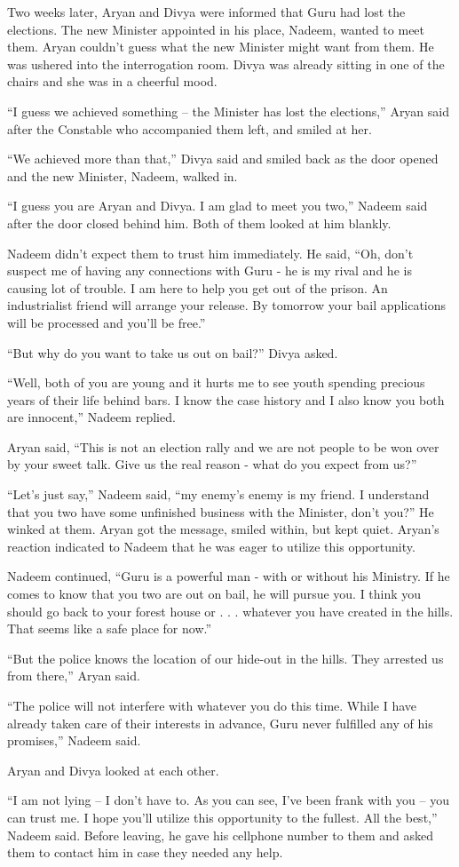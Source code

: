 Two weeks later, Aryan and Divya were informed that Guru had lost the elections.
The new Minister appointed in his place, Nadeem, wanted to meet them. Aryan
couldn't guess what the new Minister might want from them. He was ushered into
the interrogation room. Divya was already sitting in one of the chairs and she
was in a cheerful mood.

“I guess we achieved something – the Minister has lost the elections,” Aryan
said after the Constable who accompanied them left, and smiled at her.

“We achieved more than that,” Divya said and smiled back as the door opened and
the new Minister, Nadeem, walked in.

“I guess you are Aryan and Divya. I am glad to meet you two,” Nadeem said after
the door closed behind him. Both of them looked at him blankly.

Nadeem didn't expect them to trust him immediately. He said, “Oh, don't suspect
me of having any connections with Guru - he is my rival and he is causing lot of
trouble. I am here to help you get out of the prison. An industrialist friend
will arrange your release. By tomorrow your bail applications will be processed
and you'll be free.”

“But why do you want to take us out on bail?” Divya asked.

“Well, both of you are young and it hurts me to see youth spending precious
years of their life behind bars. I know the case history and I also know you
both are innocent,” Nadeem replied.

Aryan said, “This is not an election rally and we are not people to be won over
by your sweet talk. Give us the real reason - what do you expect from us?”

“Let's just say,” Nadeem said, “my enemy's enemy is my friend. I understand that
you two have some unfinished business with the Minister, don't you?” He winked
at them. Aryan got the message, smiled within, but kept quiet. Aryan's reaction
indicated to Nadeem that he was eager to utilize this opportunity.

Nadeem continued, “Guru is a powerful man - with or without his Ministry. If he
comes to know that you two are out on bail, he will pursue you. I think you
should go back to your forest house or . . . whatever you have created in the
hills. That seems like a safe place for now.”

“But the police knows the location of our hide-out in the hills. They arrested
us from there,” Aryan said.

“The police will not interfere with whatever you do this time. While I have
already taken care of their interests in advance, Guru never fulfilled any of
his promises,” Nadeem said.

Aryan and Divya looked at each other.

“I am not lying – I don't have to. As you can see, I've been frank with you –
you can trust me. I hope you'll utilize this opportunity to the fullest. All the
best,” Nadeem said. Before leaving, he gave his cellphone number to them and
asked them to contact him in case they needed any help.